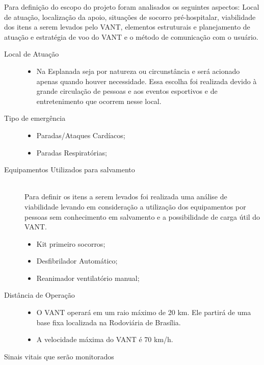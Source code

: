 \label{escopo}
Para definição do escopo do projeto foram analisados os seguintes aspectos: Local de atuação, localização da apoio, situações de socorro pré-hospitalar, viabilidade dos itens a serem levados pelo VANT, elementos estruturais e planejamento de atuação e estratégia de voo do VANT e o método de comunicação com o usuário.
\begin{description}
  \item[Local de Atuação] \hfill 
  	\begin{itemize}
  		\item Na Esplanada seja por natureza ou circunstância e será acionado apenas quando houver necessidade. Essa escolha foi realizada devido à grande circulação de pessoas e aos eventos esportivos e de entretenimento que ocorrem nesse local.

  	\end{itemize}
  \item[Tipo de emergência] \hfill 
  	\begin{itemize}
  		\item Paradas/Ataques Cardíacos;
		\item Paradas Respiratórias;
  	\end{itemize}
  \item[Equipamentos Utilizados para salvamento] \hfill \\
  	Para definir os itens a serem levados foi realizada uma análise de viabilidade levando em consideração a utilização dos equipamentos por pessoas sem conhecimento em salvamento e a possibilidade de carga útil do VANT.
  	\begin{itemize}
  		\item Kit primeiro socorros;
		\item Desfibrilador Automático;
		\item Reanimador ventilatório manual;
  	\end{itemize}
  \item[Distância de Operação] \hfill 
  	\begin{itemize}
	  
	  \item O VANT operará em um raio máximo de 20 km. Ele partirá de uma base fixa localizada na Rodoviária de Brasília.

	  \item A velocidade máxima do VANT é 70 km/h.  
  	\end{itemize}
  \item[Sinais vitais que serão monitorados] \hfill 
  	\begin{itemize}
	

\end{itemize}
\end{description}
